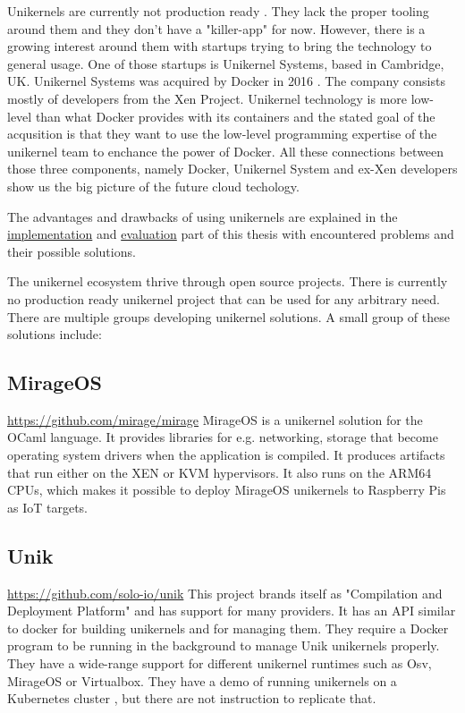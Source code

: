 Unikernels are currently not production ready \cite{unfit-for-production}. They lack the proper tooling around them and they don't have a "killer-app" for now. However, there is a growing interest around them with startups trying to bring the technology to general usage. One of those startups is Unikernel Systems, based in Cambridge, UK. Unikernel Systems was acquired by Docker in 2016 \cite{docker-acquisiton}. The company consists mostly of developers from the Xen Project. Unikernel technology is more low-level than what Docker provides with its containers and the stated goal of the acqusition is that they want to use the low-level programming expertise of the unikernel team to enchance the power of Docker. All these connections between those three components, namely Docker, Unikernel System and ex-Xen developers show us the big picture of the future cloud techology.

The advantages and drawbacks of using unikernels are explained in the \hyperref[chapter:implementation]{implementation} and \hyperref[chapter:evaluation]{evaluation} part of this thesis with encountered problems and their possible solutions.

The unikernel ecosystem thrive through open source projects. There is currently no production ready unikernel project that can be used for any arbitrary need. There are multiple groups developing unikernel solutions. A small group of these solutions include:
\subsection*{MirageOS}

\url{https://github.com/mirage/mirage} \cite{madhavapeddy2014unikernels}
  MirageOS is a unikernel solution for the OCaml language. It provides libraries for e.g. networking, storage that become operating system drivers when the application is compiled. It produces artifacts that run either on the XEN or KVM hypervisors. It also runs on the ARM64 CPUs, which makes it possible to deploy MirageOS unikernels to Raspberry Pis as IoT targets.
\subsection*{Unik}
\url{https://github.com/solo-io/unik} \cite{levine2016unik} This project brands itself as "Compilation and Deployment Platform" and has support for many providers. It has an API similar to docker for building unikernels and for managing them. They require a Docker program to be running in the background to manage Unik unikernels properly. They have a wide-range support for different unikernel runtimes such as Osv, MirageOS or Virtualbox. They have a demo of running unikernels on a Kubernetes cluster \cite{unik-youtube}, but there are not instruction to replicate that.
